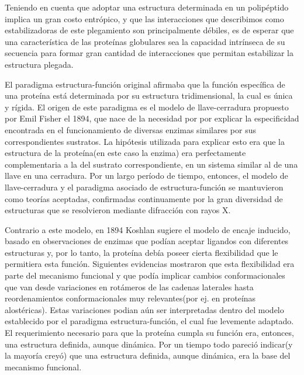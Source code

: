 Teniendo en cuenta que adoptar una estructura determinada en un polipéptido implica un gran costo entrópico, y que las interacciones que describimos como estabilizadoras de este plegamiento son principalmente débiles, 
es de esperar que una característica de las proteínas globulares sea la capacidad intrínseca de su secuencia para formar gran cantidad de interacciones que permitan estabilizar la estructura plegada.





El paradigma estructura-función original afirmaba que la función específica de una proteína está determinada por su estructura tridimensional, la cual es única y rígida. 
El origen de este paradigma es el modelo de llave-cerradura propuesto por Emil Fisher el 1894, 
que nace de la necesidad por por explicar la especificidad encontrada en el funcionamiento de diversas enzimas similares por sus correspondientes sustratos. 
La hipótesis utilizada para explicar esto era que la estructura de la proteína(en este caso la enzima) era perfectamente complementaria a la del sustrato correspondiente, en un sistema similar al de una llave en una cerradura.
Por un largo período de tiempo, entonces, el modelo de llave-cerradura y el paradigma asociado de estructura-función se mantuvieron como teorías aceptadas, confirmadas continuamente por la
gran diversidad de estructuras que se resolvieron mediante difracción con rayos X. 

Contrario a este modelo, en 1894 Koshlan sugiere el modelo de encaje inducido, basado en observaciones de enzimas que podían aceptar 
ligandos con diferentes estructuras y, por lo tanto, la proteína debía poseer cierta flexibilidad que le permitiera esta función.
Siguientes evidencias mostraron que esta flexibilidad era parte del mecanismo funcional y que podía implicar cambios conformacionales que van desde variaciones en rotámeros de las cadenas laterales hasta 
reordenamientos conformacionales muy relevantes(por ej. en proteínas alostéricas).
Estas variaciones podian aún ser interpretadas dentro del modelo establecido por el paradigma estructura-función, el cual fue levemente adaptado.
El requerimiento necesario para que la proteína cumpla su función era, entonces, una estructura definida, aunque dinámica. 
Por un tiempo todo pareció indicar(y la mayoría creyó) que una estructura definida, aunque dinámica, era la base del mecanismo funcional.


